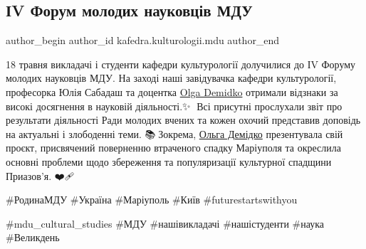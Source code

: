  
 
 
 
 

\subsection{ІV Форум молодих науковців МДУ}
\label{sec:18_05_2023.fb.kafedra.kulturologii.mdu.1.iv_forum_molodyh_naukovciv_mdu}
 
\ifcmt
 author_begin
   author_id kafedra.kulturologii.mdu
 author_end
\fi

18 травня викладачі і студенти кафедри культурології долучилися до ІV Форуму
молодих науковців МДУ. На заході наші завідувачка кафедри культурології,
професорка Юлія Сабадаш та доцентка \href{\urlDemidkoIA}{Olga Demidko} отримали відзнаки за високі
досягнення в науковій діяльності.✨️👏 Всі присутні прослухали звіт про
результати діяльності Ради молодих вчених та кожен охочий представив доповідь
на актуальні і злободенні теми. 📚📑Зокрема, \href{\urlDemidkoIA}{Ольга Демідко} презентувала свій
проєкт, присвячений поверненню втраченого спадку Маріуполя та окреслила основні
проблеми щодо збереження та популяризації культурної спадщини Приазов'я.
❤️🩹 

\#РодинаМДУ  \#Україна \#Маріуполь \#Київ  \#futurestartswithyou

\#mdu\_cultural\_studies \#МДУ \#нашівикладачі \#нашістуденти \#наука \#Великдень
